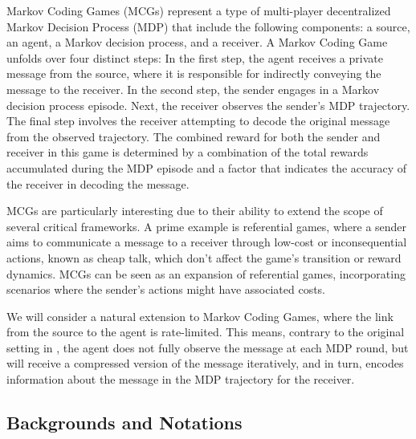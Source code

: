 Markov Coding Games (MCGs) \cite{sokota2022communicating} represent a type of multi-player decentralized Markov Decision Process (MDP) that include the following components: a source, an agent, a Markov decision process, and a receiver. A Markov Coding Game unfolds over four distinct steps:  In the first step, the agent receives a private message from the source, where it is responsible for indirectly conveying the message to the receiver. In the second step, the sender engages in a Markov decision process episode. Next, the receiver observes the sender’s MDP trajectory. The final step involves the receiver attempting to decode the original message from the observed trajectory. The combined reward for both the sender and receiver in this game is determined by a combination of the total rewards accumulated during the MDP episode and a factor that indicates the accuracy of the receiver in decoding the message.

MCGs are particularly interesting due to their ability to extend the scope of several critical frameworks. A prime example is referential games, where a sender aims to communicate a message to a receiver through low-cost or inconsequential actions, known as cheap talk, which don’t affect the game’s transition or reward dynamics. MCGs can be seen as an expansion of referential games, incorporating scenarios where the sender’s actions might have associated costs.

We will consider a natural extension to Markov Coding Games, where the link from the source to the agent is rate-limited. This means, contrary to the original setting in \cite{sokota2022communicating}, the agent does not fully observe the message at each MDP round, but will receive a compressed version of the message iteratively, and in turn, encodes information about the message in the MDP trajectory for the receiver.


\subsection{Backgrounds and Notations}
